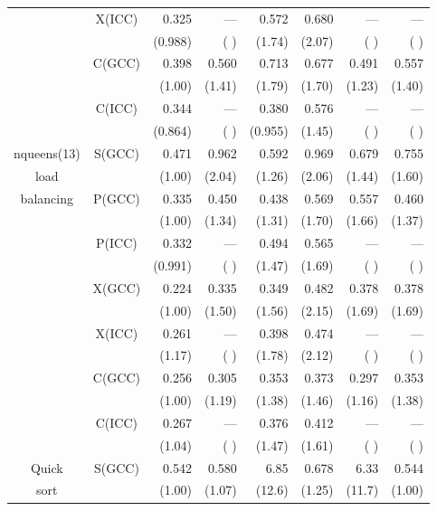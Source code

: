 \documentclass[a4j]{jarticle}
\begin{document}
\begin{table*}[!t]
\begin{center}
\begin{tabular}{|c|c|r|r|r|r|r|r|}
           & X(ICC) & 0.325  & ---    & 0.572  & 0.680  & ---    & ---   \\ 
           &        & (0.988)& (    ) & (1.74) & (2.07) & (    ) & (    )\\ \cline{2-8}
           & C(GCC) & 0.398  & 0.560  & 0.713  & 0.677  & 0.491  & 0.557 \\ 
           &        & (1.00) & (1.41) & (1.79) & (1.70) & (1.23) & (1.40)\\ \cline{2-8}
           & C(ICC) & 0.344  & ---    & 0.380  & 0.576  & ---    & ---   \\ 
           &        & (0.864)& (    ) & (0.955)& (1.45) & (    ) & (    )\\ \hline
nqueens(13)& S(GCC) & 0.471  & 0.962  & 0.592  & 0.969  & 0.679  & 0.755 \\ 
  load     &        & (1.00) & (2.04) & (1.26) & (2.06) & (1.44) & (1.60)\\ \cline{2-8}
balancing  & P(GCC) & 0.335  & 0.450  & 0.438  & 0.569  & 0.557  & 0.460 \\ 
           &        & (1.00) & (1.34) & (1.31) & (1.70) & (1.66) & (1.37)\\ \cline{2-8}
           & P(ICC) & 0.332  & ---    & 0.494  & 0.565  & ---    & ---   \\ 
           &        & (0.991)& (    ) & (1.47) & (1.69) & (    ) & (    )\\ \cline{2-8}
           & X(GCC) & 0.224  & 0.335  & 0.349  & 0.482  & 0.378  & 0.378 \\ 
           &        & (1.00) & (1.50) & (1.56) & (2.15) & (1.69) & (1.69)\\ \cline{2-8}
           & X(ICC) & 0.261  & ---    & 0.398  & 0.474  & ---    & ---   \\ 
           &        & (1.17) & (    ) & (1.78) & (2.12) & (    ) & (    )\\ \cline{2-8}
           & C(GCC) & 0.256  & 0.305  & 0.353  & 0.373  & 0.297  & 0.353 \\ 
           &        & (1.00) & (1.19) & (1.38) & (1.46) & (1.16) & (1.38)\\ \cline{2-8}
           & C(ICC) & 0.267  & ---    & 0.376  & 0.412  & ---    & ---   \\ 
           &        & (1.04) & (    ) & (1.47) & (1.61) & (    ) & (    )\\ \hline
Quick      & S(GCC) & 0.542  & 0.580  & 6.85   & 0.678  & 6.33   & 0.544 \\ 
sort       &        & (1.00) & (1.07) & (12.6) & (1.25) & (11.7) & (1.00)\\ \cline{2-8}

\end{tabular}
\end{center}
\end{table*}
\end{document}

